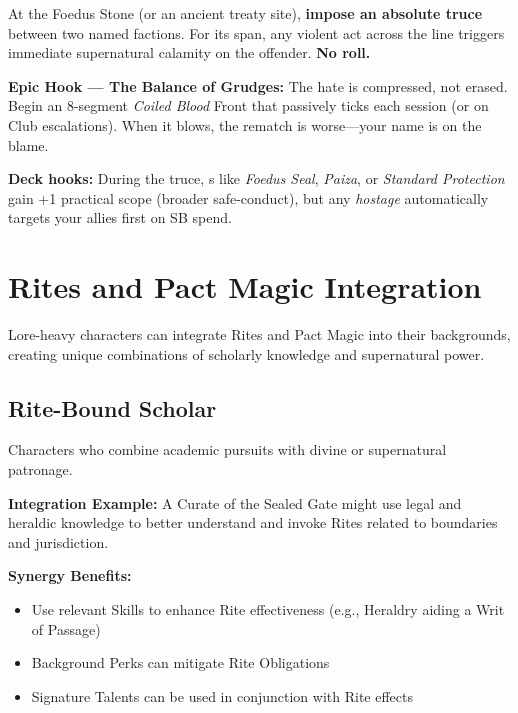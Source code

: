 \begin{tcolorbox}[enhanced,sharp corners,boxrule=.6pt,title={Talent — The Law That Binds Spears (18 XP, 1/campaign)}]
At the Foedus Stone (or an ancient treaty site), \textbf{impose an absolute truce} between two named factions. For its span, any violent act across the line triggers immediate supernatural calamity on the offender. \textbf{No roll.}
\end{tcolorbox}

\textbf{Epic Hook — The Balance of Grudges:} The hate is compressed, not erased. Begin an 8-segment \emph{Coiled Blood} Front that passively ticks each session (or on Club escalations). When it blows, the rematch is worse—your name is on the blame.

\textbf{Deck hooks:} During the truce, \SuitDiamond{}s like \emph{Foedus Seal}, \emph{Paiza}, or \emph{Standard Protection} gain +1 practical scope (broader safe-conduct), but any \emph{hostage} \SuitClub{} automatically targets your allies first on SB spend.

\section{Rites and Pact Magic Integration}

Lore-heavy characters can integrate Rites and Pact Magic into their backgrounds, creating unique combinations of scholarly knowledge and supernatural power.

\subsection{Rite-Bound Scholar}
Characters who combine academic pursuits with divine or supernatural patronage.

\textbf{Integration Example:} A Curate of the Sealed Gate might use legal and heraldic knowledge to better understand and invoke Rites related to boundaries and jurisdiction.

\textbf{Synergy Benefits:}
\begin{itemize}
    \item Use relevant Skills to enhance Rite effectiveness (e.g., Heraldry aiding a Writ of Passage)
    \item Background Perks can mitigate Rite Obligations
    \item Signature Talents can be used in conjunction with Rite effects
\end{itemize}

